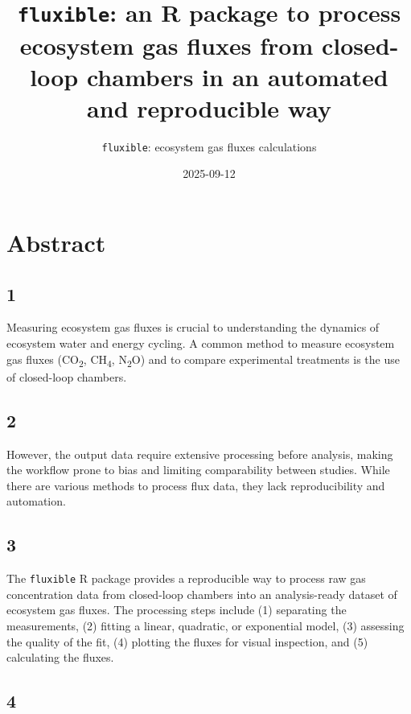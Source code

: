 \documentclass[
  letterpaper,
  DIV=11,
  numbers=noendperiod]{scrartcl}
\title{\texttt{fluxible}: an R package to process ecosystem gas fluxes
from closed-loop chambers in an automated and reproducible way}
\subtitle{\texttt{fluxible}: ecosystem gas fluxes calculations}
\author{}
\date{2025-09-12}
\begin{document}
\maketitle


\section*{Abstract}\label{abstract}

\subsection*{1}\label{section}

Measuring ecosystem gas fluxes is crucial to understanding the dynamics
of ecosystem water and energy cycling. A common method to measure
ecosystem gas fluxes (CO\textsubscript{2}, CH\textsubscript{4},
N\textsubscript{2}O) and to compare experimental treatments is the use
of closed-loop chambers.

\subsection*{2}\label{section-1}

However, the output data require extensive processing before analysis,
making the workflow prone to bias and limiting comparability between
studies. While there are various methods to process flux data, they lack
reproducibility and automation.

\subsection*{3}\label{section-2}

The \texttt{fluxible} R package provides a reproducible way to process
raw gas concentration data from closed-loop chambers into an
analysis-ready dataset of ecosystem gas fluxes. The processing steps
include (1) separating the measurements, (2) fitting a linear,
quadratic, or exponential model, (3) assessing the quality of the fit,
(4) plotting the fluxes for visual inspection, and (5) calculating the
fluxes.

\subsection*{4}\label{section-3}
\end{document}
